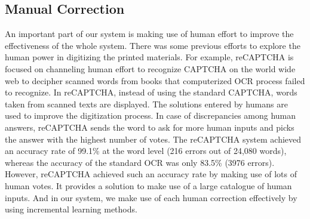 \subsection{Manual Correction}
An important part of our system is making use of human effort 
to improve the effectiveness of the whole system. 
There was some previous efforts to explore the human power in 
digitizing the printed materials. 
For example, reCAPTCHA \cite{von2008recaptcha} 
is focused on channeling human effort to recognize CAPTCHA 
on the world wide web to decipher scanned words from books that computerized 
OCR process failed to recognize. In reCAPTCHA, 
instead of using the standard CAPTCHA, words taken from scanned texts 
are displayed. The solutions entered by humans are used to improve the 
digitization process. 
In case of discrepancies among human answers, reCAPTCHA sends the word to 
ask for more human inputs and picks the answer with the highest 
number of votes. 
The reCAPTCHA system achieved an accuracy rate 
of 99.1\% at the word level (216 errors out of 24,080 words), 
whereas the accuracy of the standard OCR was only 83.5\% (3976 errors). 
However, reCAPTCHA achieved such an accuracy rate by making use of lots of human votes. 
It provides a solution to make use of a large catalogue of human inputs. 
And in our system, we make use of each human correction effectively
by using incremental learning methods. 






